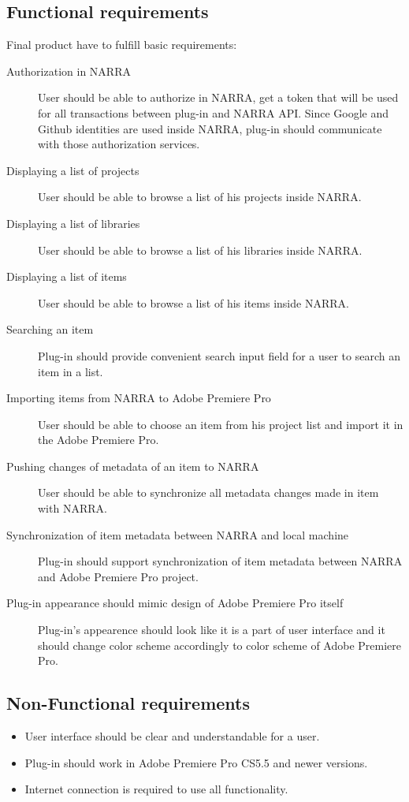 \documentclass[thesis=B,english]{FITthesis}[2012/10/20]
\begin{document}
\subsection{Functional requirements}
Final product have to fulfill basic requirements:
	\begin{description}
		\item [Authorization in NARRA] 
User should be able to authorize in NARRA, get a token that will be used for all transactions between plug-in and NARRA API. Since Google and Github identities are used inside NARRA, plug-in should communicate with those authorization services.
		\item [Displaying a list of projects]
User should be able to browse a list of his projects inside NARRA.
		\item [Displaying a list of libraries]
User should be able to browse a list of his libraries inside NARRA.
		\item [Displaying a list of items]
User should be able to browse a list of his items inside NARRA.
		\item [Searching an item]
Plug-in should provide convenient search input field for a user to search an item in a list.
		\item [Importing items from NARRA to Adobe Premiere Pro]
User should be able to choose an item from his project list and import it in the Adobe Premiere Pro.
		\item [Pushing changes of metadata of an item to NARRA]
User should be able to synchronize all metadata changes made in item with NARRA.
		\item [Synchronization of item metadata between NARRA and local machine]
Plug-in should support synchronization of item metadata between NARRA and Adobe Premiere Pro project.
		\item [Plug-in appearance should mimic design of Adobe Premiere Pro itself]
Plug-in's appearence should look like it is a part of user interface and it should change color scheme accordingly to color scheme of Adobe Premiere Pro.
	\end{description}
\subsection{Non-Functional requirements}
	\begin{itemize}
		\item User interface should be clear and understandable for a user.
		\item Plug-in should work in Adobe Premiere Pro CS5.5 and newer versions.
		\item Internet connection is required to use all functionality.
	\end{itemize}
\end{document}
